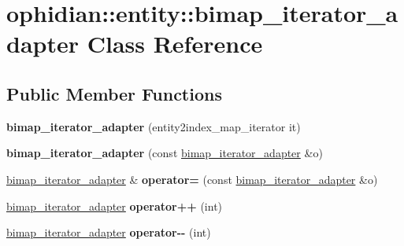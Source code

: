 \hypertarget{classophidian_1_1entity_1_1bimap__iterator__adapter}{\section{ophidian\-:\-:entity\-:\-:bimap\-\_\-iterator\-\_\-adapter Class Reference}
\label{classophidian_1_1entity_1_1bimap__iterator__adapter}
}
\subsection*{Public Member Functions}
\begin{DoxyCompactItemize}
\item 
\hypertarget{classophidian_1_1entity_1_1bimap__iterator__adapter_a600e74f80b4925bb4acdd6a4a7c98d30}{{\bfseries bimap\-\_\-iterator\-\_\-adapter} (entity2index\-\_\-map\-\_\-iterator it)}\label{classophidian_1_1entity_1_1bimap__iterator__adapter_a600e74f80b4925bb4acdd6a4a7c98d30}

\item 
\hypertarget{classophidian_1_1entity_1_1bimap__iterator__adapter_af37cbb6dc3965eece5c2bcbc5e951448}{{\bfseries bimap\-\_\-iterator\-\_\-adapter} (const \hyperlink{classophidian_1_1entity_1_1bimap__iterator__adapter}{bimap\-\_\-iterator\-\_\-adapter} \&o)}\label{classophidian_1_1entity_1_1bimap__iterator__adapter_af37cbb6dc3965eece5c2bcbc5e951448}

\item 
\hypertarget{classophidian_1_1entity_1_1bimap__iterator__adapter_a98b6354a14c0d619cccfedf9dfb251ac}{\hyperlink{classophidian_1_1entity_1_1bimap__iterator__adapter}{bimap\-\_\-iterator\-\_\-adapter} \& {\bfseries operator=} (const \hyperlink{classophidian_1_1entity_1_1bimap__iterator__adapter}{bimap\-\_\-iterator\-\_\-adapter} \&o)}\label{classophidian_1_1entity_1_1bimap__iterator__adapter_a98b6354a14c0d619cccfedf9dfb251ac}

\item 
\hypertarget{classophidian_1_1entity_1_1bimap__iterator__adapter_a4377f7dfb305108d2df1a054e3162b89}{\hyperlink{classophidian_1_1entity_1_1bimap__iterator__adapter}{bimap\-\_\-iterator\-\_\-adapter} {\bfseries operator++} (int)}\label{classophidian_1_1entity_1_1bimap__iterator__adapter_a4377f7dfb305108d2df1a054e3162b89}

\item 
\hypertarget{classophidian_1_1entity_1_1bimap__iterator__adapter_aa09a1cd1f68ec0f1a7267e51c2ea1ea4}{\hyperlink{classophidian_1_1entity_1_1bimap__iterator__adapter}{bimap\-\_\-iterator\-\_\-adapter} {\bfseries operator-\/-\/} (int)}\label{classophidian_1_1entity_1_1bimap__iterator__adapter_aa09a1cd1f68ec0f1a7267e51c2ea1ea4}


\end{DoxyCompactItemize}
